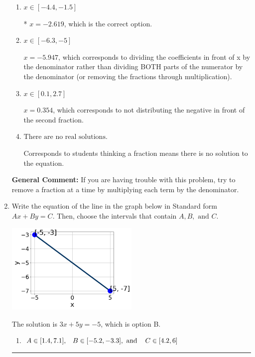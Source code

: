 \documentclass{extbook}[14pt]
\newcommand{\litem}[1]{\item #1

\rule{\textwidth}{0.4pt}}
\begin{document}
\begin{enumerate}
{\begin{enumerate}[label=\Alph*.]
 $x = -0.881$, which corresponds to dividing the second number in the numerator by the denominator rather than dividing BOTH parts of the numerator by the denominator (or removing the fractions through multiplication).
\item \( x \in [-4.4, -1.5] \)

* $x = -2.619$, which is the correct option.
\item \( x \in [-6.3, -5] \)

 $x = -5.947$, which corresponds to dividing the coefficients in front of x by the denominator rather than dividing BOTH parts of the numerator by the denominator (or removing the fractions through multiplication).
\item \( x \in [0.1, 2.7] \)

 $x = 0.354$, which corresponds to not distributing the negative in front of the second fraction.
\item \( \text{There are no real solutions.} \)

Corresponds to students thinking a fraction means there is no solution to the equation.
\end{enumerate}

\textbf{General Comment:} If you are having trouble with this problem, try to remove a fraction at a time by multiplying each term by the denominator.
}
\litem{
Write the equation of the line in the graph below in Standard form $Ax+By=C$. Then, choose the intervals that contain $A, B, \text{ and } C$.

\begin{center}
    \includegraphics[width=0.5\textwidth]{../Figures/linearGraphToStandardCopyB.png}
\end{center}




The solution is \( 3x + 5y = -5 \), which is option B.\begin{enumerate}[label=\Alph*.]
\item \( A \in [1.4, 7.1], \hspace{3mm} B \in [-5.2, -3.3], \text{ and } \hspace{3mm} C \in [4.2, 6] \)


\end{enumerate}}
\end{enumerate}
\end{document}
